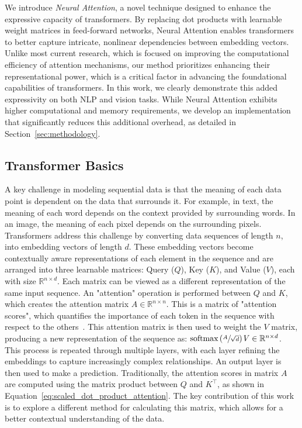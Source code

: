 \documentclass{article}
\begin{document}
We introduce \textit{Neural Attention}, a novel technique designed to enhance the expressive capacity of transformers. By replacing dot products with learnable weight matrices in feed-forward networks, Neural Attention enables transformers to better capture intricate, nonlinear dependencies between embedding vectors. Unlike most current research, which is focused on improving the computational efficiency of attention mechanisms, our method prioritizes enhancing their representational power, which is a critical factor in advancing the foundational capabilities of transformers. In this work, we clearly demonstrate this added expressivity on both NLP and vision tasks. While Neural Attention exhibits higher computational and memory requirements, we develop an implementation that significantly reduces this additional overhead, as detailed in Section~\ref{sec:methodology}.

\subsection{Transformer Basics}
\label{subsec:transformer_basics}
A key challenge in modeling sequential data is that the meaning of each data point is dependent on the data that surrounds it. For example, in text, the meaning of each word depends on the context provided by surrounding words. In an image, the meaning of each pixel depends on the surrounding pixels. Transformers address this challenge by converting data sequences of length \( n \), into embedding vectors of length \( d \). These embedding vectors become contextually aware representations of each element in the sequence and are arranged into three learnable matrices: Query (\( \mathit{Q} \)), Key (\( \mathit{K} \)), and Value (\( \mathit{V} \)), each with size \( \mathbb{R}^{n \times d} \). Each matrix can be viewed as a different representation of the same input sequence.  An "attention" operation is performed between $\mathit{Q}$ and $\mathit{K}$, which creates the attention matrix $\mathit{A} \in \mathbb{R}^{n \times n}$. This is a matrix of "attention scores", which quantifies the importance of each token in the sequence with respect to the others~\cite{vaswani2017attention}. This attention matrix is then used to weight the \( \mathit{V} \) matrix, producing a new representation of the sequence as: $\text{softmax}\left(\smash{\sfrac{\mathit{A}}{\sqrt{d}}}\right)\!\mathit{V} \in \mathbb{R}^{n \times d}$. This process is repeated through multiple layers, with each layer refining the embeddings to capture increasingly complex relationships. An output layer is then used to make a prediction. Traditionally, the attention scores in matrix $\mathit{A}$ are computed using the matrix product between $\mathit{Q}$ and $\mathit{K^\top}$, as shown in Equation~\ref{eq:scaled_dot_product_attention}. The key contribution of this work is to explore a different method for calculating this matrix, which allows for a better contextual understanding of the data.
\end{document}
